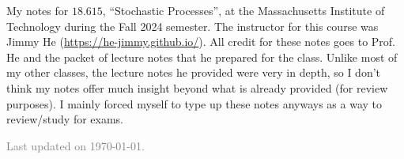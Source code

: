\documentclass[11pt]{article}
\begin{document}
\maketitle

My notes for $18.615$, ``Stochastic Processes'', at the Massachusetts Institute of Technology during the Fall 2024 semester. The instructor for this course was Jimmy He (\url{https://he-jimmy.github.io/}). All credit for these notes goes to Prof. He and the packet of lecture notes that he prepared for the class. Unlike most of my other classes, the lecture notes he provided were very in depth, so I don't think my notes offer much insight beyond what is already provided (for review purposes). I mainly forced myself to type up these notes anyways as a way to review/study for exams. 



\vfill

\hfill \textcolor{gray}{\small Last updated on \today.}
\newpage
\tableofcontents 
\newpage
\importfiles %
\end{document}
